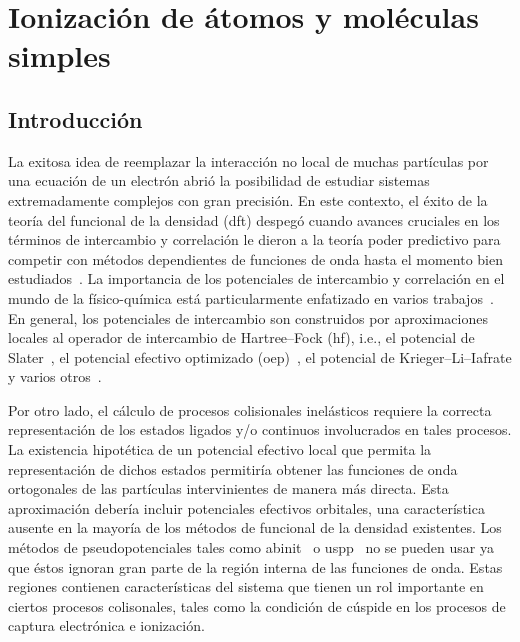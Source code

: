 \chapter{Ionización de átomos y moléculas simples}

\section{Introducción}

La exitosa idea de reemplazar la interacción no local de muchas 
partículas por una ecuación de un electrón abrió la posibilidad de 
estudiar sistemas extremadamente complejos con gran precisión.
En este contexto, el éxito de la teoría del funcional de la densidad
(\acs{dft}) \cite{HohenberKohn:64,KohnSham:65} despegó cuando avances 
cruciales en los términos de intercambio y correlación le dieron a la 
teoría poder predictivo para competir con métodos dependientes de 
funciones de onda hasta el momento bien estudiados~\cite{Becke:14}.
La importancia de los potenciales de intercambio y 
correlación en el mundo de la físico-química está particularmente
enfatizado en varios trabajos~\cite{Bartlett:10,Verma:12}.
En general, los potenciales de intercambio son construidos por 
aproximaciones locales al operador de intercambio de Hartree--Fock 
(\acs{hf}), i.e., el potencial de Slater~\cite{Slater:51}, el potencial 
efectivo optimizado (\acs{oep})~\cite{Sharp:53,Talman:76,Talman:89}, el 
potencial de Krieger--Li--Iafrate\cite{Krieger:92} y varios 
otros~\cite{Gorling:92,Yang:02,Staroverov:06,Ryabinkin:13}.

Por otro lado, el cálculo de procesos colisionales inelásticos requiere 
la correcta representación de los estados ligados y/o continuos 
involucrados en tales procesos. La existencia hipotética de un potencial 
efectivo local que permita la representación de dichos estados 
permitiría obtener las funciones de onda ortogonales de las partículas
intervinientes de manera más directa. Esta aproximación debería incluir
potenciales efectivos orbitales, una característica ausente en la 
mayoría de los métodos de funcional de la densidad existentes. 
Los métodos de pseudopotenciales tales como {\sc abinit}~\cite{abinit} 
o {\sc uspp}~\cite{Vanderbilt} no se pueden usar ya que éstos ignoran 
gran parte de la región interna de las funciones de onda. Estas regiones
contienen características del sistema que tienen un rol importante en
ciertos procesos colisonales, tales como la condición de cúspide en los 
procesos de captura electrónica e ionización. 

